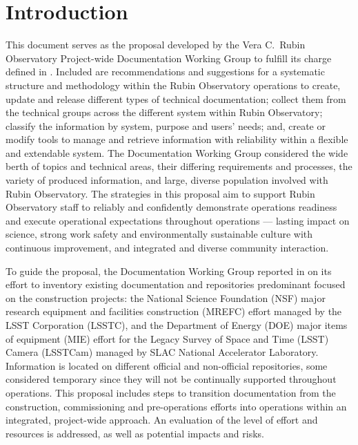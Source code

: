 \section{Introduction}

This document serves as the proposal developed by the Vera C.\ Rubin Observatory Project-wide Documentation Working Group to fulfill its charge defined in .
Included are recommendations and suggestions for a systematic structure and methodology within the Rubin Observatory operations to create, update and release different types of technical documentation; collect them from the technical groups across the different system within Rubin Observatory; classify the information by system, purpose and users' needs; and, create or modify tools to manage and retrieve information with reliability within a flexible and extendable system.
The Documentation Working Group considered the wide berth of topics and technical areas, their differing requirements and processes, the variety of produced information, and large, diverse population involved with Rubin Observatory.
The strategies in this proposal aim to support Rubin Observatory staff to reliably and confidently demonstrate operations readiness  and execute operational expectations throughout operations --- lasting impact on science, strong work safety and environmentally sustainable culture with continuous improvement, and integrated and diverse community interaction.

To guide the proposal, the Documentation Working Group reported in  on its effort to inventory existing documentation and repositories predominant focused on the construction projects: the National Science Foundation (NSF) major research equipment and facilities construction (MREFC) effort managed by the LSST Corporation (LSSTC), and the Department of Energy (DOE) major items of equipment (MIE) effort for the Legacy Survey of Space and Time (LSST) Camera (LSSTCam) managed by SLAC National Accelerator Laboratory.
Information is located on different official and non-official repositories, some considered temporary since they will not be continually supported throughout operations.
This proposal includes steps to transition documentation from the construction, commissioning and pre-operations efforts into operations within an integrated, project-wide approach.
An evaluation of the level of effort and resources is addressed, as well as potential impacts and risks.

